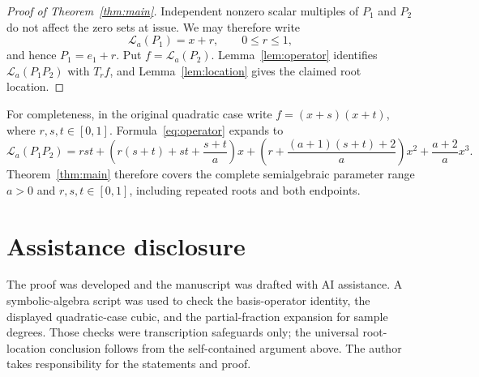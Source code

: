 \documentclass[11pt]{article}
\newcommand{\La}{\mathcal{L}_a}
\begin{document}
\begin{proof}[Proof of Theorem~\ref{thm:main}]
Independent nonzero scalar multiples of $P_1$ and $P_2$ do not affect the
zero sets at issue.  We may therefore write
\[
 \La(P_1)=x+r,\qquad 0\leq r\leq1,
\]
and hence $P_1=e_1+r$.  Put $f=\La(P_2)$.  Lemma~\ref{lem:operator}
identifies $\La(P_1P_2)$ with $T_rf$, and
Lemma~\ref{lem:location} gives the claimed root location.
\end{proof}

For completeness, in the original quadratic case write
$f=(x+s)(x+t)$, where $r,s,t\in[0,1]$.  Formula~\eqref{eq:operator} expands
to
\[
 \La(P_1P_2)=rst+
 \left(r(s+t)+st+\frac{s+t}{a}\right)x+
 \left(r+\frac{(a+1)(s+t)+2}{a}\right)x^2+
 \frac{a+2}{a}x^3.
\]
Theorem~\ref{thm:main} therefore covers the complete semialgebraic parameter
range $a>0$ and $r,s,t\in[0,1]$, including repeated roots and both endpoints.

\section*{Assistance disclosure}

The proof was developed and the manuscript was drafted with AI assistance.
A symbolic-algebra script was used to check the basis-operator identity, the
displayed quadratic-case cubic, and the partial-fraction expansion for sample
degrees.  Those checks were transcription safeguards only; the universal
root-location conclusion follows from the self-contained argument above.
The author takes responsibility for the statements and proof.



\end{document}
